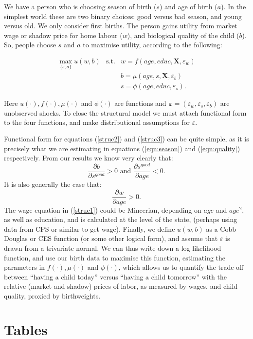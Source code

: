 \documentclass[a4paper, 11 pt]{article}
\theoremstyle{plain}
\begin{document}
\begin{spacing}{1.2}
We have a person who is choosing season of birth ($s$) and age of birth ($a$).  
In the simplest world these are two binary choices: good versus bad season, and 
young versus old.  We only consider first births.  The person gains utility from 
market wage or shadow price for home 
labour ($w$), and biological quality of the child ($b$).  So, people choose $s$ 
and $a$ to maximise utility, according to the following:


\begin{eqnarray}
\label{struc1}
\max_{\{s,a\}} u(w,b) &\text{s.t.}& w=f(age,educ,\mathbf{X},\varepsilon_w) \\ 
\label{struc2}
&& b=\mu(age,s,\mathbf{X},\varepsilon_b)                                  \\ 
\label{struc3}
&& s=\phi(age,educ,\varepsilon_s). 
\end{eqnarray}

Here $u(\cdot), f(\cdot), \mu(\cdot)$ and $\phi(\cdot)$ are functions and 
$\mathbf{\varepsilon}=(\varepsilon_w,\varepsilon_s,\varepsilon_b)$ are 
unobserved shocks.  To close the structural model we must attach functional
form to the four functions, and make distributional assumptions for $\varepsilon$.

Functional form for equations (\ref{struc2}) and (\ref{struc3}) can be quite simple, 
as it is precisely what we are estimating in equations (\ref{eqn:season}) and 
(\ref{eqn:quality}) respectively.  From our results we know very clearly that:
\[
\frac{\partial b}{\partial s^{good}}>0 \text{\ and \ }
\frac{\partial s^{good}}{\partial age}<0.
\]
It is also generally the case that:
\[
\frac{\partial w}{\partial age}>0.
\]
The wage equation in (\ref{struc1}) could be Mincerian, depending on $age$ and 
$age^2$, as well as education, and is calculated at the level of the state, 
(perhaps using data from CPS or similar to get wage).  Finally, we define $u(w,b)$ 
as a Cobb-Douglas
or CES function (or some other logical form), and assume that $\varepsilon$ is
drawn from a trivariate normal.  We can thus write down a log-likelihood function,
and use our birth data to maximise this function, estimating the parameters in
$f(\cdot), \mu(\cdot)$ and $\phi(\cdot)$, which allows us to quantify the
trade-off between ``having a child today'' versus ``having a child tomorrow'' 
with the relative (market and shadow) prices of labor, as measured by wages, and 
child quality, proxied by birthweights.

\newpage

\newpage
\section*{Tables}



\end{spacing}
\end{document}
